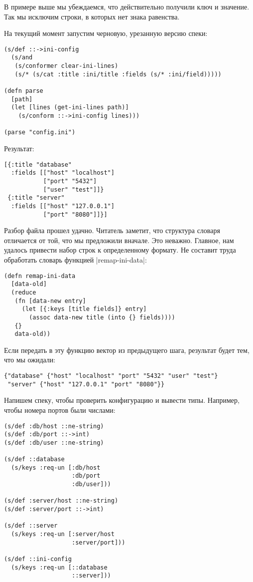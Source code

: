В примере выше мы убеждаемся, что действительно получили ключ и значение. Так мы
исключим строки, в которых нет знака равенства.

На текущий момент запустим черновую, урезанную версию спеки:

\begin{verbatim}
(s/def ::->ini-config
  (s/and
   (s/conformer clear-ini-lines)
   (s/* (s/cat :title :ini/title :fields (s/* :ini/field)))))

(defn parse
  [path]
  (let [lines (get-ini-lines path)]
    (s/conform ::->ini-config lines)))

(parse "config.ini")
\end{verbatim}

Результат:

\begin{verbatim}
[{:title "database"
  :fields [["host" "localhost"]
           ["port" "5432"]
           ["user" "test"]]}
 {:title "server"
  :fields [["host" "127.0.0.1"]
           ["port" "8080"]]}]
\end{verbatim}

Разбор файла прошел удачно. Читатель заметит, что структура словаря отличается
от той, что мы предложили вначале. Это неважно. Главное, нам удалось привести
набор строк к определенному формату. Не составит труда обработать словарь
функцией \spverb|remap-ini-data|:

\begin{verbatim}
(defn remap-ini-data
  [data-old]
  (reduce
   (fn [data-new entry]
     (let [{:keys [title fields]} entry]
       (assoc data-new title (into {} fields))))
   {}
   data-old))
\end{verbatim}

Если передать в эту функцию вектор из предыдущего шага, результат будет тем, что
мы ожидали:

\begin{verbatim}
{"database" {"host" "localhost" "port" "5432" "user" "test"}
 "server" {"host" "127.0.0.1" "port" "8080"}}
\end{verbatim}

Напишем спеку, чтобы проверить конфигурацию и вывести типы. Например, чтобы
номера портов были числами:

\begin{verbatim}
(s/def :db/host ::ne-string)
(s/def :db/port ::->int)
(s/def :db/user ::ne-string)

(s/def ::database
  (s/keys :req-un [:db/host
                   :db/port
                   :db/user]))

(s/def :server/host ::ne-string)
(s/def :server/port ::->int)

(s/def ::server
  (s/keys :req-un [:server/host
                   :server/port]))

(s/def ::ini-config
  (s/keys :req-un [::database
                   ::server]))
\end{verbatim}


